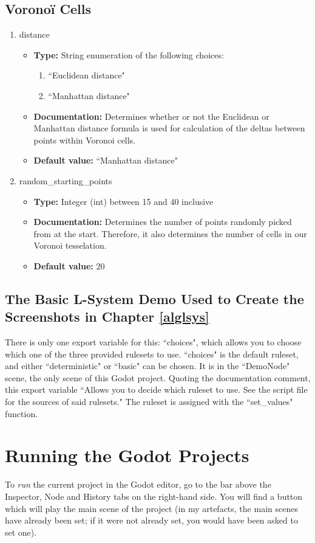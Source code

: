 \subsection{Voronoï Cells}

\begin{enumerate}
    \item distance
    \begin{itemize}
        \item \textbf{Type:} String enumeration of the following choices:
        \begin{enumerate}
            \item ``Euclidean distance"
            \item ``Manhattan distance"
        \end{enumerate}
        \item \textbf{Documentation:} Determines whether or not the Euclidean or Manhattan distance formula is used for calculation of the deltas between points within Voronoi cells.
        \item \textbf{Default value:} ``Manhattan distance"
    \end{itemize}
    \item random\_starting\_points
    \begin{itemize}
        \item \textbf{Type:} Integer (int) between 15 and 40 inclusive
        \item \textbf{Documentation:} Determines the number of points randomly picked from at the start. Therefore, it also determines the number of cells in our Voronoi tesselation.
        \item \textbf{Default value:} 20
    \end{itemize}
\end{enumerate}

\subsection{The Basic L-System Demo Used to Create the Screenshots in Chapter \ref{alglsys}}

There is only one export variable for this: ``choices", which allows you to choose which one of the three provided rulesets to use. ``choices" is the default ruleset, and either ``deterministic" or ``basic" can be chosen. It is in the ``DemoNode" scene, the only scene of this Godot project. Quoting the documentation comment, this export variable ``Allows you to decide which ruleset to use. See the script file for the sources of said rulesets." The ruleset is assigned with the ``set\_values" function.

\section{Running the Godot Projects} \label{runproject}

To \textit{run} the current project in the Godot editor, go to the bar above the Inspector, Node and History tabs on the right-hand side. You will find a \faPlay{} button which will play the main scene of the project (in my artefacts, the main scenes have already been set; if it were not already set, you would have been asked to set one).
